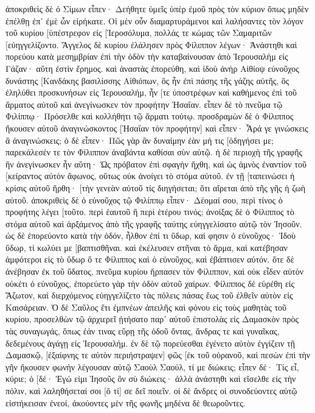 ἀποκριθεὶς δὲ ὁ Σίμων εἶπεν· Δεήθητε ὑμεῖς ὑπὲρ ἐμοῦ πρὸς τὸν κύριον ὅπως μηδὲν ἐπέλθῃ ἐπ᾽ ἐμὲ ὧν εἰρήκατε. 
Οἱ μὲν οὖν διαμαρτυράμενοι καὶ λαλήσαντες τὸν λόγον τοῦ κυρίου [ὑπέστρεφον εἰς [Ἱεροσόλυμα, πολλάς τε κώμας τῶν Σαμαριτῶν [εὐηγγελίζοντο. 
Ἄγγελος δὲ κυρίου ἐλάλησεν πρὸς Φίλιππον λέγων· Ἀνάστηθι καὶ πορεύου κατὰ μεσημβρίαν ἐπὶ τὴν ὁδὸν τὴν καταβαίνουσαν ἀπὸ Ἰερουσαλὴμ εἰς Γάζαν· αὕτη ἐστὶν ἔρημος. 
καὶ ἀναστὰς ἐπορεύθη, καὶ ἰδοὺ ἀνὴρ Αἰθίοψ εὐνοῦχος δυνάστης [Κανδάκης βασιλίσσης Αἰθιόπων, ὃς ἦν ἐπὶ πάσης τῆς γάζης αὐτῆς, ὃς ἐληλύθει προσκυνήσων εἰς Ἰερουσαλήμ, 
ἦν [τε ὑποστρέφων καὶ καθήμενος ἐπὶ τοῦ ἅρματος αὐτοῦ καὶ ἀνεγίνωσκεν τὸν προφήτην Ἠσαΐαν. 
εἶπεν δὲ τὸ πνεῦμα τῷ Φιλίππῳ· Πρόσελθε καὶ κολλήθητι τῷ ἅρματι τούτῳ. 
προσδραμὼν δὲ ὁ Φίλιππος ἤκουσεν αὐτοῦ ἀναγινώσκοντος [Ἠσαΐαν τὸν προφήτην] καὶ εἶπεν· Ἆρά γε γινώσκεις ἃ ἀναγινώσκεις; 
ὁ δὲ εἶπεν· Πῶς γὰρ ἂν δυναίμην ἐὰν μή τις [ὁδηγήσει με; παρεκάλεσέν τε τὸν Φίλιππον ἀναβάντα καθίσαι σὺν αὐτῷ. 
ἡ δὲ περιοχὴ τῆς γραφῆς ἣν ἀνεγίνωσκεν ἦν αὕτη· Ὡς πρόβατον ἐπὶ σφαγὴν ἤχθη, καὶ ὡς ἀμνὸς ἐναντίον τοῦ [κείραντος αὐτὸν ἄφωνος, οὕτως οὐκ ἀνοίγει τὸ στόμα αὐτοῦ. 
ἐν τῇ [ταπεινώσει ἡ κρίσις αὐτοῦ ἤρθη· [τὴν γενεὰν αὐτοῦ τίς διηγήσεται; ὅτι αἴρεται ἀπὸ τῆς γῆς ἡ ζωὴ αὐτοῦ. 
ἀποκριθεὶς δὲ ὁ εὐνοῦχος τῷ Φιλίππῳ εἶπεν· Δέομαί σου, περὶ τίνος ὁ προφήτης λέγει [τοῦτο. περὶ ἑαυτοῦ ἢ περὶ ἑτέρου τινός; 
ἀνοίξας δὲ ὁ Φίλιππος τὸ στόμα αὐτοῦ καὶ ἀρξάμενος ἀπὸ τῆς γραφῆς ταύτης εὐηγγελίσατο αὐτῷ τὸν Ἰησοῦν. 
ὡς δὲ ἐπορεύοντο κατὰ τὴν ὁδόν, ἦλθον ἐπί τι ὕδωρ, καί φησιν ὁ εὐνοῦχος· Ἰδοὺ ὕδωρ, τί κωλύει με [βαπτισθῆναι. 
καὶ ἐκέλευσεν στῆναι τὸ ἅρμα, καὶ κατέβησαν ἀμφότεροι εἰς τὸ ὕδωρ ὅ τε Φίλιππος καὶ ὁ εὐνοῦχος, καὶ ἐβάπτισεν αὐτόν. 
ὅτε δὲ ἀνέβησαν ἐκ τοῦ ὕδατος, πνεῦμα κυρίου ἥρπασεν τὸν Φίλιππον, καὶ οὐκ εἶδεν αὐτὸν οὐκέτι ὁ εὐνοῦχος, ἐπορεύετο γὰρ τὴν ὁδὸν αὐτοῦ χαίρων. 
Φίλιππος δὲ εὑρέθη εἰς Ἄζωτον, καὶ διερχόμενος εὐηγγελίζετο τὰς πόλεις πάσας ἕως τοῦ ἐλθεῖν αὐτὸν εἰς Καισάρειαν. 
Ὁ δὲ Σαῦλος ἔτι ἐμπνέων ἀπειλῆς καὶ φόνου εἰς τοὺς μαθητὰς τοῦ κυρίου, προσελθὼν τῷ ἀρχιερεῖ 
ᾐτήσατο παρ᾽ αὐτοῦ ἐπιστολὰς εἰς Δαμασκὸν πρὸς τὰς συναγωγάς, ὅπως ἐάν τινας εὕρῃ τῆς ὁδοῦ ὄντας, ἄνδρας τε καὶ γυναῖκας, δεδεμένους ἀγάγῃ εἰς Ἰερουσαλήμ. 
ἐν δὲ τῷ πορεύεσθαι ἐγένετο αὐτὸν ἐγγίζειν τῇ Δαμασκῷ, [ἐξαίφνης τε αὐτὸν περιήστραψεν] φῶς [ἐκ τοῦ οὐρανοῦ, 
καὶ πεσὼν ἐπὶ τὴν γῆν ἤκουσεν φωνὴν λέγουσαν αὐτῷ Σαοὺλ Σαούλ, τί με διώκεις; 
εἶπεν δέ· Τίς εἶ, κύριε; ὁ [δέ· Ἐγώ εἰμι Ἰησοῦς ὃν σὺ διώκεις· 
ἀλλὰ ἀνάστηθι καὶ εἴσελθε εἰς τὴν πόλιν, καὶ λαληθήσεταί σοι [ὅ τί] σε δεῖ ποιεῖν. 
οἱ δὲ ἄνδρες οἱ συνοδεύοντες αὐτῷ εἱστήκεισαν ἐνεοί, ἀκούοντες μὲν τῆς φωνῆς μηδένα δὲ θεωροῦντες. 
